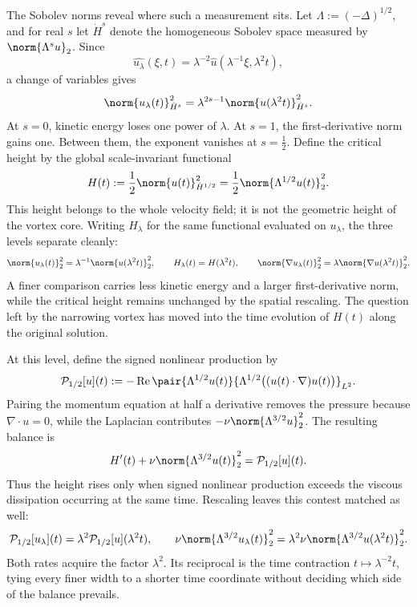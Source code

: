The Sobolev norms reveal where such a measurement sits. Let \(\Lambda:=(-\Delta)^{1/2}\), and for real \(s\) let \(\dot H^s\) denote the homogeneous Sobolev space measured by \(\norm{\Lambda^s u}_2\). Since
\[
  \widehat{u_\lambda}(\xi,t)
  =
  \lambda^{-2}\widehat u(\lambda^{-1}\xi,\lambda^2t),
\]
a change of variables gives
\[
  \norm{u_\lambda(t)}_{\dot H^s}^2
  =
  \lambda^{2s-1}
  \norm{u(\lambda^2t)}_{\dot H^s}^2.
\]
At \(s=0\), kinetic energy loses one power of \(\lambda\). At \(s=1\), the first-derivative norm gains one. Between them, the exponent vanishes at \(s=\tfrac12\). Define the critical height by the global scale-invariant functional
\[
  H(t)
  :=
  \frac12\norm{u(t)}_{\dot H^{1/2}}^2
  =
  \frac12\norm{\Lambda^{1/2}u(t)}_2^2.
\]
This height belongs to the whole velocity field; it is not the geometric height of the vortex core. Writing \(H_\lambda\) for the same functional evaluated on \(u_\lambda\), the three levels separate cleanly:
\[
  \norm{u_\lambda(t)}_2^2
  =
  \lambda^{-1}\norm{u(\lambda^2t)}_2^2,
  \qquad
  H_\lambda(t)=H(\lambda^2t),
  \qquad
  \norm{\nabla u_\lambda(t)}_2^2
  =
  \lambda\norm{\nabla u(\lambda^2t)}_2^2.
\]
A finer comparison carries less kinetic energy and a larger first-derivative norm, while the critical height remains unchanged by the spatial rescaling. The question left by the narrowing vortex has moved into the time evolution of \(H(t)\) along the original solution.


At this level, define the signed nonlinear production by
\[
  \mathcal P_{1/2}[u](t)
  :=
  -\operatorname{Re}
  \pair
    {\Lambda^{1/2}u(t)}
    {\Lambda^{1/2}\bigl((u(t)\cdot\nabla)u(t)\bigr)}_{L^2}.
\]
Pairing the momentum equation at half a derivative removes the pressure because \(\nabla\cdot u=0\), while the Laplacian contributes \(-\nu\norm{\Lambda^{3/2}u}_2^2\). The resulting balance is
\[
  H'(t)
  +
  \nu\norm{\Lambda^{3/2}u(t)}_2^2
  =
  \mathcal P_{1/2}[u](t).
\]
Thus the height rises only when signed nonlinear production exceeds the viscous dissipation occurring at the same time. Rescaling leaves this contest matched as well:
\[
  \mathcal P_{1/2}[u_\lambda](t)
  =
  \lambda^2\mathcal P_{1/2}[u](\lambda^2t),
  \qquad
  \nu\norm{\Lambda^{3/2}u_\lambda(t)}_2^2
  =
  \lambda^2\nu\norm{\Lambda^{3/2}u(\lambda^2t)}_2^2.
\]
Both rates acquire the factor \(\lambda^2\). Its reciprocal is the time contraction \(t\mapsto\lambda^{-2}t\), tying every finer width to a shorter time coordinate without deciding which side of the balance prevails.

